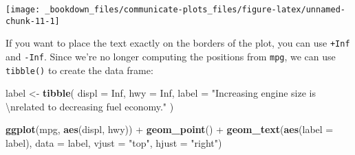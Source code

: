 \documentclass[]{book}
\newenvironment{Shaded}{\begin{snugshade}}{\end{snugshade}}
\newcommand{\KeywordTok}[1]{\textcolor[rgb]{0.13,0.29,0.53}{\textbf{{#1}}}}
\newcommand{\DataTypeTok}[1]{\textcolor[rgb]{0.13,0.29,0.53}{{#1}}}
\newcommand{\CharTok}[1]{\textcolor[rgb]{0.31,0.60,0.02}{{#1}}}
\newcommand{\StringTok}[1]{\textcolor[rgb]{0.31,0.60,0.02}{{#1}}}
\newcommand{\OtherTok}[1]{\textcolor[rgb]{0.56,0.35,0.01}{{#1}}}
\newcommand{\NormalTok}[1]{{#1}}
\begin{document}
\begin{Shaded}
\end{Shaded}

\begin{center}\texttt{[image: \_bookdown\_files/communicate-plots\_files/figure-latex/unnamed-chunk-11-1]} \end{center}

If you want to place the text exactly on the borders of the plot, you
can use \texttt{+Inf} and \texttt{-Inf}. Since we're no longer computing
the positions from \texttt{mpg}, we can use \texttt{tibble()} to create
the data frame:

\begin{Shaded}
\begin{Highlighting}[]
\NormalTok{label <-}\StringTok{ }\KeywordTok{tibble}\NormalTok{(}
  \DataTypeTok{displ =} \OtherTok{Inf}\NormalTok{,}
  \DataTypeTok{hwy =} \OtherTok{Inf}\NormalTok{,}
  \DataTypeTok{label =} \StringTok{"Increasing engine size is }\CharTok{\textbackslash{}n}\StringTok{related to decreasing fuel economy."}
\NormalTok{)}

\KeywordTok{ggplot}\NormalTok{(mpg, }\KeywordTok{aes}\NormalTok{(displ, hwy)) +}
\StringTok{  }\KeywordTok{geom_point}\NormalTok{() +}
\StringTok{  }\KeywordTok{geom_text}\NormalTok{(}\KeywordTok{aes}\NormalTok{(}\DataTypeTok{label =} \NormalTok{label), }\DataTypeTok{data =} \NormalTok{label, }\DataTypeTok{vjust =} \StringTok{"top"}\NormalTok{, }\DataTypeTok{hjust =} \StringTok{"right"}\NormalTok{)}
\end{Highlighting}
\end{Shaded}
\end{document}
